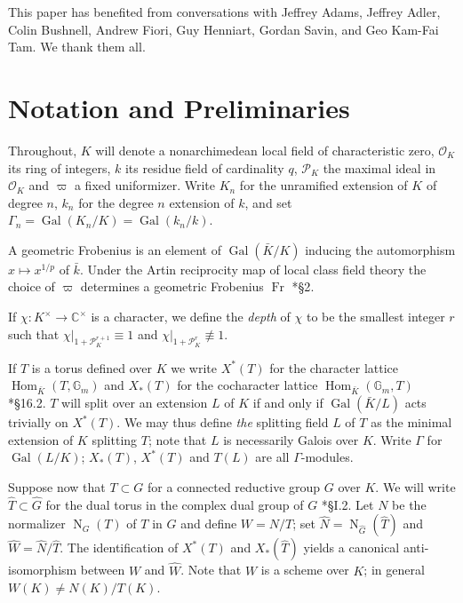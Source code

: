 \documentclass{amsart}
\theoremstyle{plain}
\theoremstyle{definition}
\numberwithin{equation}{section}
\DeclareMathOperator{\Gal}{Gal}
\DeclareMathOperator{\Hom}{Hom}
\DeclareMathOperator{\Fr}{Fr}
\newcommand{\OK}{\mathcal{O}_K}
\newcommand{\PK}{\mathcal{P}_K}
\newcommand{\Gm}{\mathbb{G}_m}
\newcommand{\Normalizer}[2]{\operatorname{N}_{#2}(#1)}
\begin{document}
This paper has benefited from conversations with Jeffrey Adams, Jeffrey Adler, Colin Bushnell,
Andrew Fiori, Guy Henniart, Gordan Savin, and Geo Kam-Fai Tam.  We thank them all.

\section{Notation and Preliminaries} \label{section:notation}

Throughout, $K$ will denote a nonarchimedean local field of
characteristic zero, $\OK$ its ring of integers, $k$ its residue field of cardinality $q$,
$\PK$ the maximal ideal in $\OK$ and $\varpi$ a fixed uniformizer.
Write $K_n$ for the unramified extension of $K$ of degree $n$, $k_n$ for
the degree $n$ extension of $k$,
and set $\Gamma_n = \Gal(K_n/K) = \Gal(k_n/k)$.

A geometric Frobenius is an element of $\Gal(\bar{K}/K)$
inducing the automorphism $x \mapsto x^{1/p}$ of $\bar{k}$.  Under the
Artin reciprocity map of local class field theory the choice of $\varpi$
determines a geometric Frobenius $\Fr$ \cite{serre:LocalClassFieldThy}*{\S 2}.

If $\chi : K^{\times} \rightarrow \mathbb{C}^{\times}$ is a character, we define
the \emph{depth} of $\chi$ to be the smallest integer $r$ such that
$\chi|_{1 + \PK^{r+1}} \equiv 1$ and
$\chi|_{1 + \PK^{r}} \not\equiv 1$.

If $T$ is a torus defined over $K$ we write $X^*(T)$
for the character lattice $\Hom_{\bar{K}}(T, \Gm)$ and $X_*(T)$ for the
cocharacter lattice $\Hom_{\bar{K}}(\Gm, T)$ \cite{humphreys:LinAlgGrps}*{\S 16.2}.
$T$ will split over an extension
$L$ of $K$ if and only if $\Gal(\bar{K}/L)$ acts trivially on $X^*(T)$.
We may thus define \emph{the} splitting field $L$ of $T$ as the
minimal extension of $K$ splitting $T$; note that $L$ is necessarily
Galois over $K$.  Write $\Gamma$ for $\Gal(L/K)$; $X_*(T)$, $X^*(T)$ and $T(L)$
are all $\Gamma$-modules.

Suppose now that $T \subset G$ for a connected reductive group $G$ over $K$.
We will write $\hat{T} \subset \hat{G}$ for the dual torus in the complex dual group of $G$ \cite{borel:79a}*{\S I.2}.
Let $N$ be the normalizer $\Normalizer{T}{G}$ of $T$ in $G$ and define $W = N/T$;
set $\hat{N} = \Normalizer{\hat{T}}{\hat{G}}$ and
$\hat{W} = \hat{N}/\hat{T}$.  The identification of $X^*(T)$ and $X_*(\hat{T})$
yields a canonical anti-isomorphism between $W$ and $\hat{W}$.
Note that $W$ is a scheme over $K$; in general $W(K) \ne N(K) / T(K)$.
\end{document}
